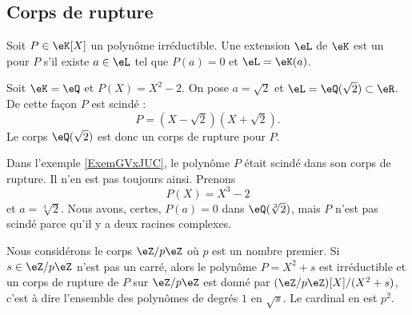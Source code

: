\subsection{Corps de rupture}

\begin{definition}
    Soit \( P\in\eK[X]\) un polynôme irréductible. Une extension \( \eL\) de \( \eK\) est un  pour \( P\) s'il existe \( a\in \eL\) tel que \( P(a)=0\) et \( \eL=\eK(a)\).
\end{definition}

\begin{example}     \label{ExemGVxJUC}
    Soit \( \eK=\eQ\) et \( P(X)=X^2-2\). On pose \( a=\sqrt{2}\) et \( \eL=\eQ(\sqrt{2})\subset\eR\). De cette façon \( P\) est scindé :
    \begin{equation}
        P=(X-\sqrt{2})(X+\sqrt{2}).
    \end{equation}
    Le corps \( \eQ(\sqrt{2})\) est donc un corps de rupture pour \( P\).
\end{example}

\begin{example}
    Dans l'exemple \ref{ExemGVxJUC}, le polynôme \( P\) était scindé dans son corps de rupture. Il n'en est pas toujours ainsi. Prenons 
    \begin{equation}
        P(X)=X^3-2
    \end{equation}
    et \( a=\sqrt[3]{2}\). Nous avons, certes, \( P(a)=0\) dans \( \eQ(\sqrt[3]{2})\), mais \( P\) n'est pas scindé parce qu'il y a deux racines complexes.
\end{example}

\begin{example}
    Nous considérons le corps \( \eZ/p\eZ\) où \( p\) est un nombre premier. Si \( s\in \eZ/p\eZ\) n'est pas un carré, alors le polynôme \(P= X^2+s\) est irréductible et un corps de rupture de \( P\) sur \( \eZ/p\eZ\) est donné par \( (\eZ/p\eZ)[X]/(X^2+s)\), c'est à dire l'ensemble des polynômes de degrés \( 1\) en \( \sqrt{s}\). Le cardinal en est \( p^2\).
\end{example}

